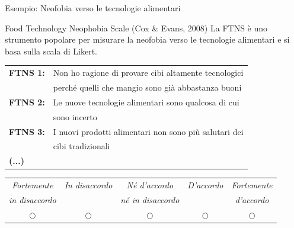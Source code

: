 \documentclass{beamer}
\begin{document}
\begin{frame}{Esempio: Neofobia verso le tecnologie alimentari}
  \begin{block}{Food Technology Neophobia Scale (Cox \& Evans, 2008)}
    La FTNS è uno strumento popolare per misurare la neofobia verso le tecnologie alimentari e si basa sulla scala di Likert.
  \end{block}
  \vspace{0.3cm}
  \small
  \begin{tabular}{l l}
    \textbf{FTNS 1:} & Non ho ragione di provare cibi altamente tecnologici \\
    & perché quelli che mangio sono già abbastanza buoni \\
    \textbf{FTNS 2:} & Le nuove tecnologie alimentari sono qualcosa di cui \\
    & sono incerto \\
    \textbf{FTNS 3:} & I nuovi prodotti alimentari non sono più salutari dei \\ 
    & cibi tradizionali \\
    \textbf{(...)}
  \end{tabular}
  \vspace{0.2cm}
  \begin{center}
    \footnotesize
    \begin{tabular}{ccccc}
      \toprule
      \textit{Fortemente} & \textit{In disaccordo} & \textit{Né d'accordo} & \textit{D'accordo} & \textit{Fortemente} \\
      \textit{in disaccordo} &  & \textit{né in disaccordo} &  & \textit{d'accordo} \\
      \midrule
      $\bigcirc$ & $\bigcirc$ & $\bigcirc$ & $\bigcirc$ & $\bigcirc$ \\
      \bottomrule
    \end{tabular}
  \end{center}
\end{frame}
\end{document}
